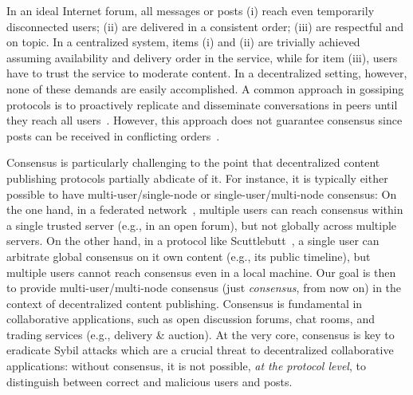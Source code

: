 \documentclass[10pt,journal,compsoc]{IEEEtran}
\begin{document}
In an ideal Internet forum, all messages or posts
(i)   reach even temporarily disconnected users;
(ii)  are delivered in a consistent order;
(iii) are respectful and on topic.
In a centralized system, items (i) and (ii) are trivially achieved assuming
availability and delivery order in the service, while for item (iii), users
have to trust the service to moderate content.
In a decentralized setting, however, none of these demands are easily
accomplished.
A common approach in gossiping protocols is to proactively replicate and
disseminate conversations in peers until they reach all
users~\cite{p2p.survey}.
However, this approach does not guarantee consensus since posts can be received
in conflicting orders~\cite{p2p.intention}.

Consensus is particularly challenging to the point that decentralized content
publishing protocols partially abdicate of it.
For instance, it is typically either possible to have multi-user/single-node or
single-user/multi-node consensus:
%
On the one hand, in a federated network~\cite{p2p.ecosystem}, multiple users
can reach consensus within a single trusted server (e.g., in an open forum),
but not globally across multiple servers.
%
On the other hand, in a protocol like Scuttlebutt~\cite{p2p.scuttlebutt}, a
single user can arbitrate global consensus on it own content (e.g., its public
timeline), but multiple users cannot reach consensus even in a local machine.
%
Our goal is then to provide multi-user/multi-node consensus (just
\emph{consensus}, from now on) in the context of decentralized content
publishing.
%
Consensus is fundamental in collaborative applications, such as open discussion
forums, chat rooms, and trading services (e.g., delivery \& auction).
At the very core, consensus is key to eradicate Sybil attacks which are a
crucial threat to decentralized collaborative applications: without
consensus, it is not possible, \emph{at the protocol level}, to distinguish
between correct and malicious users and posts.
\end{document}
